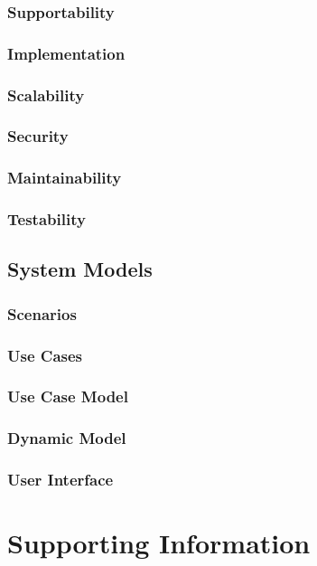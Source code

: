 \documentclass[11pt]{article}
\begin{document}
        \subsubsection{Supportability}
        \subsubsection{Implementation}
        \subsubsection{Scalability}
        \subsubsection{Security}
        \subsubsection{Maintainability}
        \subsubsection{Testability}
    
    \subsection{System Models}

        \subsubsection{Scenarios}
        \subsubsection{Use Cases}
        \subsubsection{Use Case Model}
        \subsubsection{Dynamic Model}
        \subsubsection{User Interface}


\section{Supporting Information}
\end{document}
